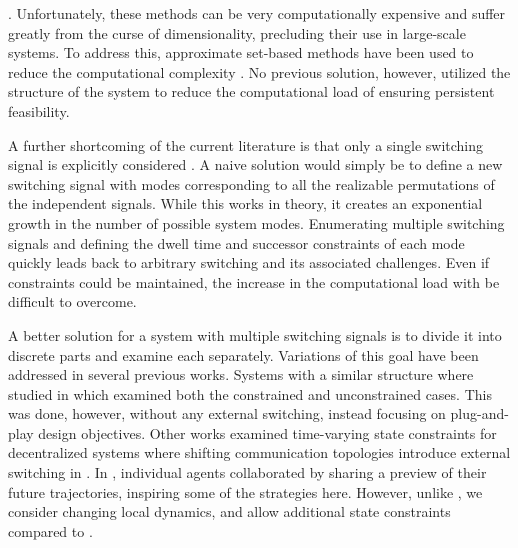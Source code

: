 . Unfortunately, these methods can be very computationally expensive and suffer greatly from the curse of dimensionality, precluding their use in large-scale systems. To address this, approximate set-based methods have been used to reduce the computational complexity . No previous solution, however, utilized the structure of the system to reduce the computational load of ensuring persistent feasibility. 

A further shortcoming of the current literature is that only a single switching signal is explicitly considered . A naive solution would simply be to define a new switching signal with modes corresponding to all the realizable permutations of the independent signals. While this works in theory, it creates an exponential growth in the number of possible system modes. Enumerating multiple switching signals and defining the dwell time and successor constraints of each mode quickly leads back to arbitrary switching and its associated challenges. Even if constraints could be maintained, the increase in the computational load with be difficult to overcome. 

A better solution for a system with multiple switching signals is to divide it into discrete parts and examine each separately. Variations of this goal have been addressed in several previous works. Systems with a similar structure where studied in \cite{Riverso2015} which examined both the constrained and unconstrained cases. This was done, however, without any external switching, instead focusing on plug-and-play design objectives. Other works examined time-varying state constraints for decentralized systems where shifting communication topologies introduce external switching in \cite{Ahandani2020, Li2020}. In \cite{Li2020}, individual agents collaborated by sharing a preview of their future trajectories, inspiring some of the strategies here. However, unlike \cite{Ahandani2020, Li2020}, we consider changing local dynamics, and allow additional state constraints compared to \cite{Li2020}.

